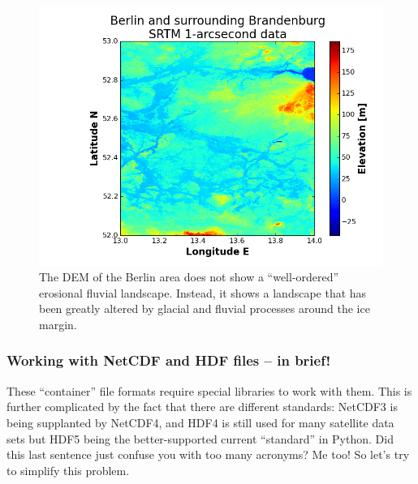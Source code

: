 \documentclass[a4paper,10pt]{scrartcl}
\begin{document}
\begin{figure}[!ht]
\begin{center}
\includegraphics[width=.9\linewidth]{figures/FilesData/BerlinBrandenburgSRTM1as.png}
\end{center}
\caption{The DEM of the Berlin area does not show a ``well-ordered'' erosional fluvial landscape. Instead, it shows a landscape that has been greatly altered by glacial and fluvial processes around the ice margin.}
\end{figure}

\subsubsection{Working with NetCDF and HDF files -- in brief!}

These ``container'' file formats require special libraries to work with them. This is further complicated by the fact that there are different standards: NetCDF3 is being supplanted by NetCDF4, and HDF4 is still used for many satellite data sets but HDF5 being the better-supported current ``standard'' in Python. Did this last sentence just confuse you with too many acronyms? Me too! So let's try to simplify this problem.
\end{document}
